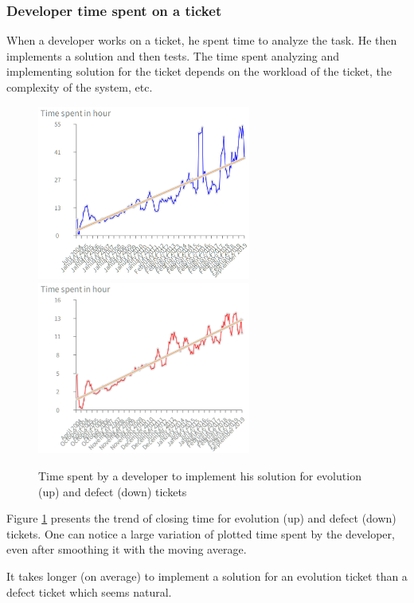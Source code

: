 \documentclass[10pt,conference]{IEEEtran}
\begin{document}
\subsubsection{Developer time spent on a ticket}

When a developer works on a ticket, he spent time to analyze the task. 
He then implements a solution and then tests.
 The time spent analyzing and implementing solution for the ticket depends on the workload of the ticket, the complexity of the system, etc.  

\begin{figure}[htbp]
  \centering
  \includegraphics[width=70mm]{./images/devEvol.png}\\
  \includegraphics[width=70mm]{./images/devDefect.png}
  \caption{Time spent by a developer to implement his solution for  evolution (up) and defect (down) tickets}
  \label{fig:devTimeDev}
\end{figure}

Figure \ref{fig:devTimeDev} presents the trend of closing time for evolution (up) and defect (down) tickets.
One can notice a large variation of plotted time spent by the developer, even after smoothing it with the moving average.

It takes longer (on average) to implement a solution for an evolution ticket than a defect ticket which seems natural.
\end{document}
